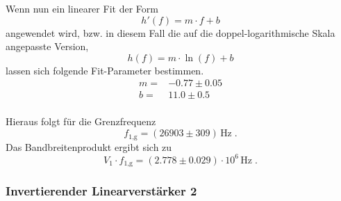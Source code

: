 Wenn nun ein linearer Fit der Form 
\begin{equation*}
    h'(f)=m\cdot f+b
\end{equation*}
angewendet wird, bzw. in diesem Fall die auf die doppel-logarithmische Skala angepasste Version, 
\begin{equation*}
    h(f)= m \cdot \ln\left({f}\right) + b
\end{equation*}
lassen sich folgende Fit-Parameter bestimmen.
\begin{align*}
    m=&-0.77\pm 0.05 \\
    b=& 11.0\pm 0.5\\
\end{align*}

Hieraus folgt für die Grenzfrequenz
\begin{equation*}
    f_{1\text{,g}}= (26903 \pm 309 )\, \unit{\hertz}\; .
\end{equation*}
Das Bandbreitenprodukt ergibt sich zu 
\begin{equation*}
    V_1\cdot f_{1\text{,g}}=(2.778\pm 0.029)\cdot 10^{6}\, \unit{\hertz}\;.
\end{equation*}

\subsubsection{Invertierender Linearverstärker 2}
\label{sec:InvertierenderLinearverstärker2}

